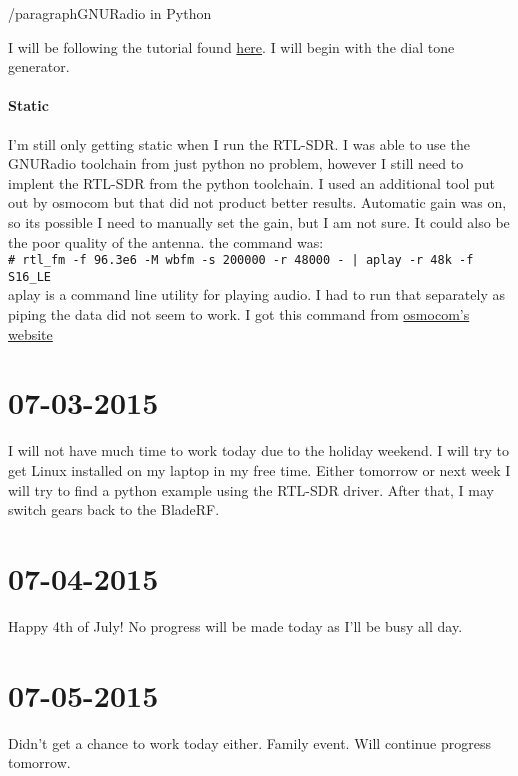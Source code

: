 \documentclass{article}
\newcommand{\shellcmd}[1]{\\\indent\indent\texttt{\footnotesize\# #1}\\}
\begin{document}
	/paragraph{GNURadio in Python}

	I will be following the tutorial found \href{http://gnuradio.org/redmine/projects/gnuradio/wiki/TutorialsWritePythonApplications}{here}. I will begin with the dial tone generator.
	\lstset{tabsize=2, caption=dial\_tone.py,}
	

	\paragraph{Static}
	I'm still only getting static when I run the RTL-SDR. I was able to use the GNURadio toolchain from just python
	no problem, however I still need to implent the RTL-SDR from the python toolchain. I used an additional
	tool put out by osmocom but that did not product better results. Automatic gain was on, so its possible I need 
	to manually set the gain, but I am not sure. It could also be the poor quality of the antenna. the command was:
	\shellcmd{rtl\_fm -f 96.3e6 -M wbfm -s 200000 -r 48000 - | aplay -r 48k -f S16\_LE}

	aplay is a command line utility for playing audio. I had to run that separately as piping the data did not seem to work. I got 	      this command from \href{http://sdr.osmocom.org/trac/wiki/rtl-sdr}{osmocom's website}		

	\section{07-03-2015}
	
	I will not have much time to work today due to the holiday weekend. I will try to get Linux installed on 
	my laptop in my free time. Either tomorrow or next week I will try to find a python example using the RTL-SDR
	driver. After that, I may switch gears back to the BladeRF. 
	
	\section{07-04-2015}
	Happy 4th of July! No progress will be made today as I'll be busy all day. 

	\section{07-05-2015}
	Didn't get a chance to work today either. Family event. Will continue progress tomorrow. 

	\newpage
\end{document}

